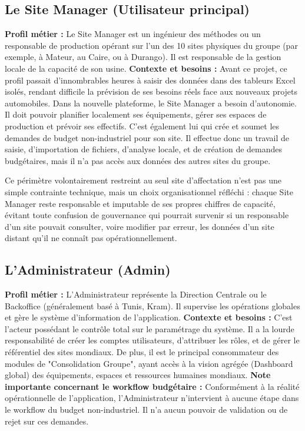 \subsection{Le Site Manager (Utilisateur principal)}
\textbf{Profil métier :} Le Site Manager est un ingénieur des méthodes ou un responsable de production opérant sur l'un des 10 sites physiques du groupe (par exemple, à Mateur, au Caire, ou à Durango). Il est responsable de la gestion locale de la capacité de son usine.
\newline
\textbf{Contexte et besoins :} Avant ce projet, ce profil passait d'innombrables heures à saisir des données dans des tableurs Excel isolés, rendant difficile la prévision de ses besoins réels face aux nouveaux projets automobiles. Dans la nouvelle plateforme, le Site Manager a besoin d'autonomie. Il doit pouvoir planifier localement ses équipements, gérer ses espaces de production et prévoir ses effectifs. C'est également lui qui crée et soumet les demandes de budget non-industriel pour son site. Il effectue donc un travail de saisie, d'importation de fichiers, d'analyse locale, et de création de demandes budgétaires, mais il n'a pas accès aux données des autres sites du groupe.

Ce périmètre volontairement restreint au seul site d'affectation n'est pas une simple contrainte technique, mais un choix organisationnel réfléchi : chaque Site Manager reste responsable et imputable de ses propres chiffres de capacité, évitant toute confusion de gouvernance qui pourrait survenir si un responsable d'un site pouvait consulter, voire modifier par erreur, les données d'un site distant qu'il ne connaît pas opérationnellement.

\subsection{L'Administrateur (Admin)}
\textbf{Profil métier :} L'Administrateur représente la Direction Centrale ou le Backoffice (généralement basé à Tunis, Kram). Il supervise les opérations globales et gère le système d'information de l'application.
\newline
\textbf{Contexte et besoins :} C'est l'acteur possédant le contrôle total sur le paramétrage du système. Il a la lourde responsabilité de créer les comptes utilisateurs, d'attribuer les rôles, et de gérer le référentiel des sites mondiaux. De plus, il est le principal consommateur des modules de "Consolidation Groupe", ayant accès à la vision agrégée (Dashboard global) des équipements, espaces et ressources humaines mondiaux. \textbf{Note importante concernant le workflow budgétaire :} Conformément à la réalité opérationnelle de l'application, l'Administrateur n'intervient à aucune étape dans le workflow du budget non-industriel. Il n'a aucun pouvoir de validation ou de rejet sur ces demandes.

